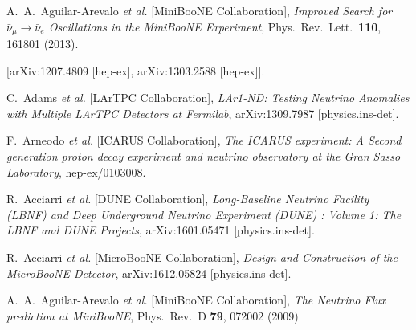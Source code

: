 \documentclass[a4paper,11pt]{article}
\begin{document}
\clearpage
\begin{thebibliography}{99}




  A.~A.~Aguilar-Arevalo {\it et al.} 
  [MiniBooNE Collaboration],
  \textit{Improved Search for $\bar \nu_\mu \rightarrow \bar \nu_e$ Oscillations in the MiniBooNE Experiment},
  Phys.\ Rev.\ Lett.\  {\bf 110}, 161801 (2013).

  [arXiv:1207.4809 [hep-ex], arXiv:1303.2588 [hep-ex]].


  C.~Adams {\it et al.} [LArTPC Collaboration],
  \textit{LAr1-ND: Testing Neutrino Anomalies with Multiple LArTPC Detectors at Fermilab},
  arXiv:1309.7987 [physics.ins-det].

  F.~Arneodo {\it et al.} [ICARUS Collaboration],
  \textit{The ICARUS experiment: A Second generation proton decay experiment and neutrino observatory at the Gran Sasso Laboratory},
  hep-ex/0103008.

  R.~Acciarri {\it et al.} [DUNE Collaboration],
  \textit{Long-Baseline Neutrino Facility (LBNF) and Deep Underground Neutrino Experiment (DUNE) : Volume 1: The LBNF and DUNE Projects},
  arXiv:1601.05471 [physics.ins-det].

  R.~Acciarri {\it et al.} [MicroBooNE Collaboration],
  \textit{Design and Construction of the MicroBooNE Detector},
  arXiv:1612.05824 [physics.ins-det].

  A.~A.~Aguilar-Arevalo {\it et al.} [MiniBooNE Collaboration],
  \textit{The Neutrino Flux prediction at MiniBooNE},
  Phys.\ Rev.\ D {\bf 79}, 072002 (2009)


\end{thebibliography}
\end{document}
